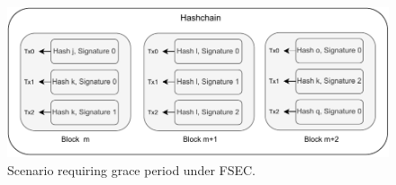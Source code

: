 \begin{figure}
  \centering
  \includegraphics[scale=0.5]{figures/grace_period.pdf}
  \caption{Scenario requiring grace period under FSEC.}
  \label{fig:grace_period}
\end{figure}


